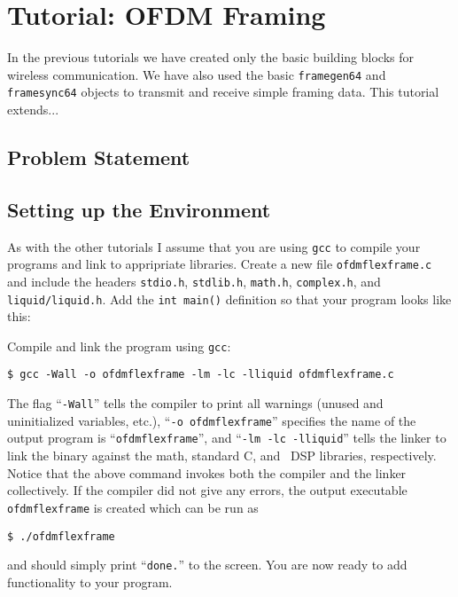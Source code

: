 % 
%

\newpage
\section{Tutorial: OFDM Framing}
\label{tutorial:ofdmflexframe}

In the previous tutorials we have created only the basic building blocks
for wireless communication.
We have also used the basic {\tt framegen64} and {\tt framesync64}
objects to transmit and receive simple framing data.
This tutorial extends...


%
%
\subsection{Problem Statement}
\label{tutorial:ofdmflexframe:problem}



%
%
\subsection{Setting up the Environment}
\label{tutorial:ofdmflexframe:environment}

As with the other tutorials I assume that you are using {\tt gcc} to
compile your programs and link to appripriate libraries.
Create a new file {\tt ofdmflexframe.c} and include the headers
{\tt stdio.h},
{\tt stdlib.h},
{\tt math.h},
{\tt complex.h}, and
{\tt liquid/liquid.h}.
Add the {\tt int main()} definition so that your program looks like
this:
%

%
Compile and link the program using {\tt gcc}:
%
\begin{Verbatim}[fontsize=\small]
    $ gcc -Wall -o ofdmflexframe -lm -lc -lliquid ofdmflexframe.c
\end{Verbatim}
%
The flag ``{\tt -Wall}'' tells the compiler to print all warnings
(unused and uninitialized variables, etc.),
``{\tt -o ofdmflexframe}'' specifies the name of the output program is
``{\tt ofdmflexframe}'', and
``{\tt -lm -lc -lliquid}'' tells the linker to link the binary against
the math, standard C, and \liquid\ DSP libraries, respectively.
Notice that the above command invokes both the compiler and the linker
collectively.
%
If the compiler did not give any errors, the output executable
{\tt ofdmflexframe} is created which can be run as
%
\begin{Verbatim}[fontsize=\small]
    $ ./ofdmflexframe
\end{Verbatim}
%
and should simply print ``{\tt done.}'' to the screen.
You are now ready to add functionality to your program.



